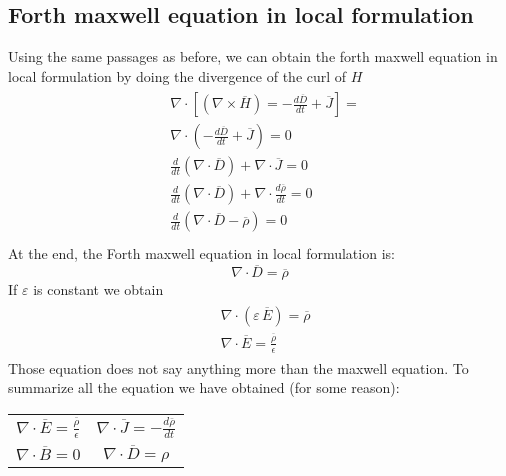 \subsection*{Forth maxwell equation in local formulation}
Using the same passages as before, we can obtain the forth maxwell equation in local formulation by doing the divergence of the curl of $H$
\begin{align}
    \begin{split}
        &\nabla \cdot \left[ (\nabla\times \overline{H})=-\frac{d\overline{D}}{dt}+\overline{J}\right]=\\[5pt]
        &\nabla \cdot \left(-\frac{d\overline{D}}{dt}+\overline{J}\right)=0\\[5pt]
        &\frac{d}{dt}(\nabla\cdot \overline{D})+\nabla\cdot \overline{J}=0\\[5pt]
        &\frac{d}{dt}(\nabla\cdot \overline{D})+\nabla\cdot \frac{d\overline\rho}{dt}=0\\[5pt]
        &\frac{d}{dt}\left(\nabla\cdot\overline{D}-\overline{\rho}\right)=0\\[5pt]
    \end{split}
\end{align}
At the end, the Forth maxwell equation in local formulation is:
\begin{equation}
    \nabla\cdot\overline{D}=\overline{\rho}
\end{equation}
If $\varepsilon$ is constant we obtain
\begin{align}
    \begin{split}
        &\nabla\cdot(\varepsilon\,\overline{E})=\overline{\rho}\\[5pt]
        &\nabla\cdot\overline{E}=\frac{\overline{\rho}}{\epsilon}
    \end{split}
\end{align}
Those equation does not say anything more than the maxwell equation.
To summarize all the equation we have obtained (for some reason):
\begin{center}
\begin{tabular}{ c c }
    $\nabla\cdot\overline{E}=\frac{\overline{\rho}}{\epsilon}$&$\nabla\cdot\overline{J}=-\frac{d\overline{\rho}}{dt}$\\[5pt]
    $\nabla\cdot\overline{B}=0$&$\nabla\cdot\overline{D}=\rho$
\end{tabular}
\end{center}